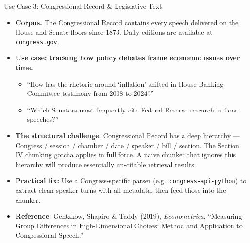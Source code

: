 \documentclass[10pt,english,aspectratio=169]{beamer}
\begin{document}
\begin{frame}{Use Case 3: Congressional Record \& Legislative Text}
\begin{itemize}
\item \textbf{Corpus.} The Congressional Record contains every speech delivered on the House and Senate floors since 1873. Daily editions are available at \texttt{congress.gov}.

\medskip
\item \textbf{Use case: tracking how policy debates frame economic issues over time.}
\begin{itemize}
    \item ``How has the rhetoric around `inflation' shifted in House Banking Committee testimony from 2008 to 2024?''
    \item ``Which Senators most frequently cite Federal Reserve research in floor speeches?''
\end{itemize}

\medskip
\item \textbf{The structural challenge.} Congressional Record has a deep hierarchy --- Congress / session / chamber / date / speaker / bill / section. The Section IV chunking gotcha applies in full force. A naive chunker that ignores this hierarchy will produce essentially un-citable retrieval results.

\medskip
\item \textbf{Practical fix:} Use a Congress-specific parser (e.g.\ \texttt{congress-api-python}) to extract clean speaker turns with all metadata, then feed those into the chunker.

\medskip
\item \textbf{Reference:} Gentzkow, Shapiro \& Taddy (2019), \emph{Econometrica}, ``Measuring Group Differences in High-Dimensional Choices: Method and Application to Congressional Speech.''
\end{itemize}
\end{frame}
\end{document}

